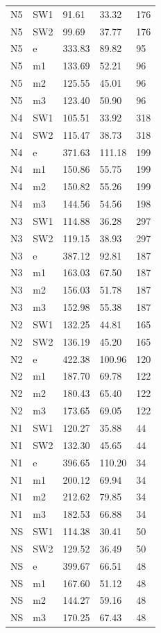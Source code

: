 \begin{longtable}{lllll}
N5	&   SW1	&   91.61	&   33.32	&   176\\
N5	&   SW2	&   99.69	&   37.77	&   176\\
N5	&   e	&   333.83	&   89.82	&   95\\
N5	&   m1	&   133.69	&   52.21	&   96\\
N5	&   m2	&   125.55	&   45.01	&   96\\
N5	&   m3	&   123.40	&   50.90	&   96\\
N4	&   SW1	&   105.51	&   33.92	&   318\\
N4	&   SW2	&   115.47	&   38.73	&   318\\
N4	&   e	&   371.63	&   111.18	&   199\\
N4	&   m1	&   150.86	&   55.75	&   199\\
N4	&   m2	&   150.82	&   55.26	&   199\\
N4	&   m3	&   144.56	&   54.56	&   198\\
N3	&   SW1	&   114.88	&   36.28	&   297\\
N3	&   SW2	&   119.15	&   38.93	&   297\\
N3	&   e	&   387.12	&   92.81	&   187\\
N3	&   m1	&   163.03	&   67.50	&   187\\
N3	&   m2	&   156.03	&   51.78	&   187\\
N3	&   m3	&   152.98	&   55.38	&   187\\
N2	&   SW1	&   132.25	&   44.81	&   165\\
N2	&   SW2	&   136.19	&   45.20	&   165\\
N2	&   e	&   422.38	&   100.96	& 120\\
N2	&   m1	&   187.70	&   69.78	&   122\\
N2	&   m2	&   180.43	&   65.40	&   122\\
N2	&   m3	&   173.65	&   69.05	&   122\\
N1	&   SW1	&   120.27	&   35.88	&   44\\
N1	&   SW2	&   132.30	&   45.65	&   44\\
N1	&   e	&   396.65	&   110.20	&   34\\
N1	&   m1	&   200.12	&   69.94	&   34\\
N1	&   m2	&   212.62	&   79.85	&   34\\
N1	&   m3	&   182.53	&   66.88	&   34\\
NS	&   SW1	&   114.38	&   30.41	&   50\\
NS	&   SW2	&   129.52	&   36.49	&   50\\
NS	&   e	&   399.67	&   66.51	&   48\\
NS	&   m1	&   167.60	&   51.12	&   48\\
NS	&   m2	&   144.27	&   59.16	&   48\\
NS	&   m3	&   170.25	&   67.43	&   48\\

\end{longtable}

